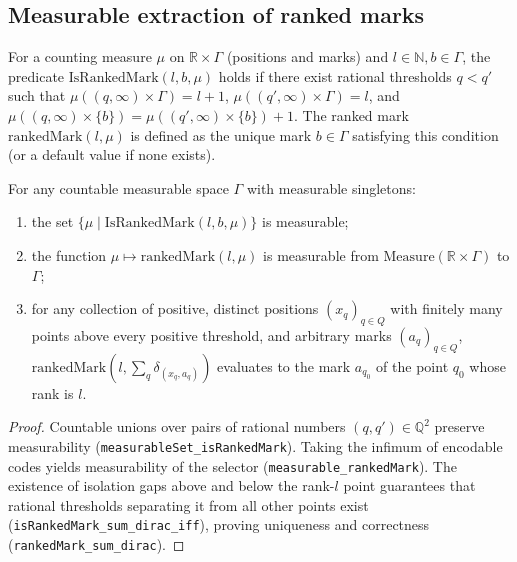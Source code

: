 \subsection*{Measurable extraction of ranked marks}

\begin{definition}\label{def:sg:ranked-mark}
  \leanok
For a counting measure $\mu$ on $\mathbb R \times \Gamma$ (positions and marks) and $l \in \mathbb N, b \in \Gamma$, the predicate $\mathrm{IsRankedMark}(l, b, \mu)$ holds if there exist rational thresholds $q < q'$ such that $\mu((q, \infty) \times \Gamma) = l + 1$, $\mu((q', \infty) \times \Gamma) = l$, and $\mu((q, \infty) \times \{b\}) = \mu((q', \infty) \times \{b\}) + 1$.
The ranked mark $\mathrm{rankedMark}(l, \mu)$ is defined as the unique mark $b \in \Gamma$ satisfying this condition (or a default value if none exists).
\end{definition}

\begin{theorem}\label{thm:sg:ranked-mark-meas}
  \leanok
For any countable measurable space $\Gamma$ with measurable singletons:
\begin{enumerate}
\item the set $\{\mu \mid \mathrm{IsRankedMark}(l, b, \mu)\}$ is measurable;
\item the function $\mu \mapsto \mathrm{rankedMark}(l, \mu)$ is measurable from $\mathrm{Measure}(\mathbb R \times \Gamma)$ to $\Gamma$;
\item for any collection of positive, distinct positions $(x_q)_{q \in Q}$ with finitely many points above every positive threshold, and arbitrary marks $(a_q)_{q \in Q}$, $\mathrm{rankedMark}(l, \sum_q \delta_{(x_q, a_q)})$ evaluates to the mark $a_{q_0}$ of the point $q_0$ whose rank is $l$.
\end{enumerate}
\end{theorem}
\begin{proof}
  \leanok
Countable unions over pairs of rational numbers $(q, q') \in \mathbb Q^2$ preserve measurability (\texttt{measurableSet\_isRankedMark}). Taking the infimum of encodable codes yields measurability of the selector (\texttt{measurable\_rankedMark}). The existence of isolation gaps above and below the rank-$l$ point guarantees that rational thresholds separating it from all other points exist (\texttt{isRankedMark\_sum\_dirac\_iff}), proving uniqueness and correctness (\texttt{rankedMark\_sum\_dirac}).
\end{proof}

